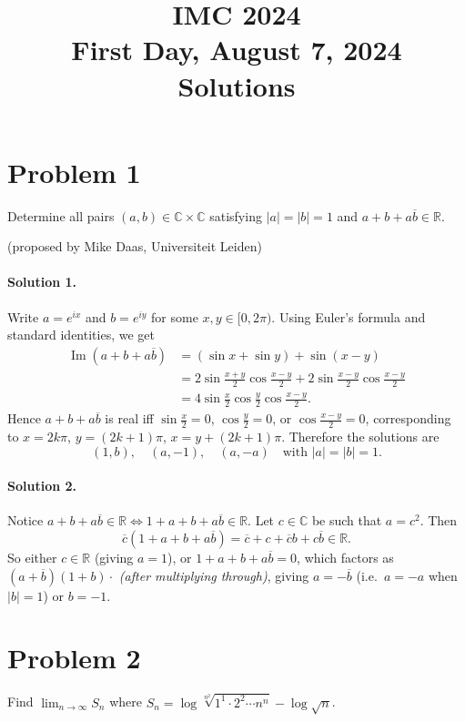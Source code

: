 \documentclass{article}
\title{IMC 2024 \\ First Day, August 7, 2024 \\ Solutions}
\date{}
\begin{document}
\maketitle

\section*{Problem 1}
Determine all pairs $(a,b) \in \mathbb{C} \times \mathbb{C}$ satisfying $|a| = |b| = 1$ and $a + b + a\overline{b} \in \mathbb{R}$.

(proposed by Mike Daas, Universiteit Leiden)

\paragraph{Solution 1.}
Write $a = e^{ix}$ and $b = e^{iy}$ for some $x, y \in [0, 2\pi)$. Using Euler's formula and standard identities, we get
\begin{align*}
\operatorname{Im}(a + b + a\overline{b}) &= (\sin x + \sin y) + \sin(x - y) \\
&= 2\sin\frac{x+y}{2}\cos\frac{x-y}{2} + 2\sin\frac{x-y}{2}\cos\frac{x-y}{2} \\
&= 4\sin\frac{x}{2}\cos\frac{y}{2}\cos\frac{x-y}{2}.
\end{align*}
Hence $a + b + a\overline{b}$ is real iff $\sin\frac{x}{2} = 0$, $\cos\frac{y}{2} = 0$, or $\cos\frac{x-y}{2} = 0$, corresponding to $x = 2k\pi$, $y = (2k+1)\pi$, $x = y + (2k+1)\pi$. Therefore the solutions are
\[
(1, b), \quad (a, -1), \quad (a, -a) \quad \text{with } |a| = |b| = 1.
\]

\paragraph{Solution 2.}
Notice $a + b + a\overline{b} \in \mathbb{R} \iff 1 + a + b + a\overline{b} \in \mathbb{R}$. Let $c \in \mathbb{C}$ be such that $a = c^2$. Then
\[
\overline{c}(1 + a + b + a\overline{b}) = \overline{c} + c + \overline{c}b + c\overline{b} \in \mathbb{R}.
\]
So either $c \in \mathbb{R}$ (giving $a = 1$), or $1 + a + b + a\overline{b} = 0$, which factors as $(a + \overline{b})(1 + b) \cdot$ \textit{(after multiplying through)}, giving $a = -\overline{b}$ (i.e.\ $a = -a$ when $|b|=1$) or $b = -1$.

\section*{Problem 2}
Find $\lim_{n \to \infty} S_n$ where $S_n = \log\sqrt[n^2]{1^1 \cdot 2^2 \cdots n^n} - \log\sqrt{n}$.
\end{document}
